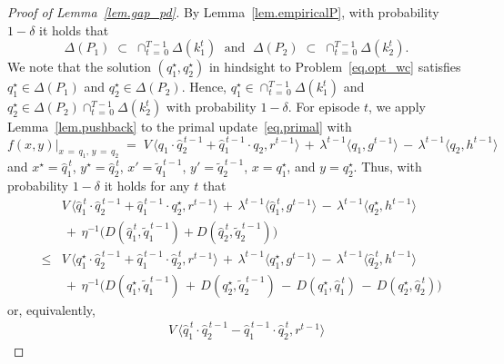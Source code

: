 \documentclass[12pt, final]{l4dc2023}
\begin{document}
\begin{proof}[Proof of Lemma~\ref{lem.gap_pd}]
	By Lemma~\ref{lem.empiricalP}, with probability $1-\delta$ it holds that 
	\[
	\Delta(P_1) \;\subset\; \cap_{t \,=\,0}^{T-1} \Delta(k_1^t) 
	\;\text{ and }\; 
	\Delta(P_2) \;\subset\; \cap_{t \,=\,0}^{T-1} \Delta(k_2^t).
	\]
	We note that the solution $(q_1^\star,q_2^\star)$ in hindsight to Problem~\eqref{eq.opt_wc} satisfies $q_1^\star\in\Delta(P_1)$ and $q_2^\star\in \Delta(P_2)$. Hence, $q_1^\star\in  \cap_{t \,=\,0}^{T-1} \Delta(k_1^t)  $ and $q_2^\star\in \Delta(P_2) \cap_{t \,=\,0}^{T-1} \Delta(k_2^t)$ with probability $1-\delta$. For episode $t$, we apply Lemma~\ref{lem.pushback} to the primal update~\eqref{eq.primal} with 
	\[
	f(x,y) \vert_{x\,=\,q_1,\, y\,=\,q_2} 
	\;=\;
	V\, \big\langle{q_1\cdot \hat q_2^{\,t-1}+\hat q_1^{\,t-1}\cdot q_2},{r^{t-1}}\big\rangle 
	\,+\,
	\lambda^{t-1} \langle{q_1},{g^{t-1}}\rangle 
	\,-\,\lambda^{t-1} \langle{q_2},{h^{t-1}}\rangle 
	\]
	and $x^\star = \hat q_1^{\,t}$, $y^\star= \hat q_2^{\,t}$, $x' = \tilde q_1^{\,t-1}$, $y'=\tilde q_2^{\,t-1}$, $x = q_1^\star$, and $y=q_2^\star$. Thus, with  probability $1-\delta$ it holds for any $t$ that
	\[
	\begin{array}{rcl}
	&& \!\!\!\! \!\!\!\! \!\! V\, \big\langle{\hat q_1^{\,t}\cdot \hat q_2^{\,t-1}+\hat q_1^{\,t-1}\cdot  q_2^\star},{r^{t-1}}\big\rangle 
	\,+\,
	\lambda^{t-1} \langle{\hat q_1^{\,t}},{g^{t-1}}\rangle 
	\,-\,\lambda^{t-1} \langle{ q_2^\star},{h^{t-1}}\rangle 
	\\[0.2cm]
	&& \!\!\!\! \!\!\!\! \!\! \,+\, \eta^{-1} \big(D(\hat q_1^{\,t},\tilde q_1^{\,t-1}) + D(\hat q_2^{\,t}, \tilde q_2^{\,t-1})\big)
	\\[0.2cm]
	&\leq  & V\, \big\langle{ q_1^\star\cdot \hat q_2^{\,t-1}+\hat q_1^{\,t-1}\cdot \hat q_2^{\,t}},{r^{t-1}}\big\rangle 
	\,+\,
	\lambda^{t-1} \langle{ q_1^\star},{g^{t-1}}\rangle 
	\,-\,\lambda^{t-1} \langle{ \hat q_2^{\,t}},{h^{t-1}}\rangle 
	\\[0.2cm]
	&& \,+\, \eta^{-1} \big(D( q_1^\star,\tilde q_1^{\,t-1}) \,+\, D( q_2^\star, \tilde q_2^{\,t-1}) \,-\, D( q_1^\star,\hat q_1^{\,t}) \,-\, D( q_2^\star, \hat q_2^{\,t}) \big)
	\end{array}
	\]
	or, equivalently,
	\begin{equation}\label{eq.pushback_V}
	\begin{array}{rcl}
	&& \!\!\!\! \!\!\!\! \!\! V\, \big\langle{\hat q_1^{\,t}\cdot \hat q_2^{\,t-1}- \hat q_1^{\,t-1}\cdot \hat q_2^{\,t}},{r^{t-1}}\big\rangle 

\end{array}
\end{equation}
\end{proof}
\end{document}
